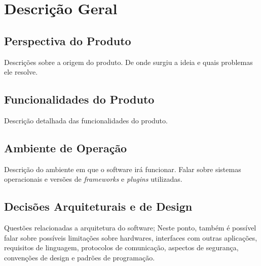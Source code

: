 \chapter{Descrição Geral}

\section{Perspectiva do Produto}

Descrições sobre a origem do produto. De onde surgiu a ideia e quais problemas ele resolve.

\section{Funcionalidades do Produto}

Descrição detalhada das funcionalidades do produto.

\section{Ambiente de Operação}

Descrição do ambiente em que o software irá funcionar. Falar sobre sistemas operacionais e versões de \textit{frameworks} e \textit{plugins} utilizadas.

\section{Decisões Arquiteturais e de Design}

Questões relacionadas a arquitetura do software; Neste ponto, também é possível falar sobre possíveis limitações sobre hardwares, interfaces com outras aplicações, requisitos de linguagem, protocolos de comunicação, aspectos de segurança, convenções de design e padrões de programação.